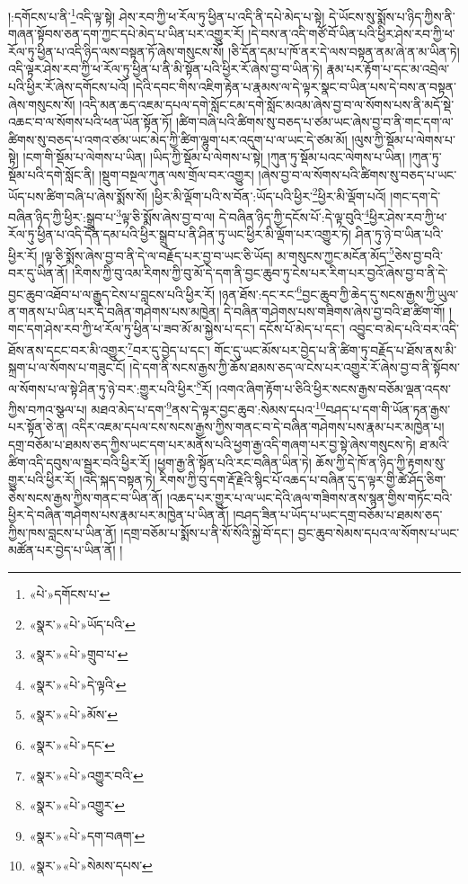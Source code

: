 །:དགོངས་པ་ནི་\footnote{«པེ་»དགོངས་པ་}འདི་ལྟ་སྟེ། ཤེས་རབ་ཀྱི་ཕ་རོལ་ཏུ་ཕྱིན་པ་འདི་ནི་དཔེ་མེད་པ་སྟེ། དེ་ཡོངས་སུ་སྨོས་པ་ཉིད་ཀྱིས་ནི་གཞན་སྟོབས་ཅན་དག་ཀྱང་དཔེ་མེད་པ་ཡིན་པར་འགྱུར་རོ། །དེ་བས་ན་འདི་གཙོ་བོ་ཡིན་པའི་ཕྱིར་ཤེས་རབ་ཀྱི་ཕ་རོལ་ཏུ་ཕྱིན་པ་འདི་ཉིད་ལས་བསྟན་ཏོ་ཞེས་གསུངས་སོ། །ཅི་དོན་དམ་པ་ཁོ་ནར་དེ་ལས་བསྟན་ནམ་ཞེ་ན་མ་ཡིན་ཏེ། འདི་ལྟར་ཤེས་རབ་ཀྱི་ཕ་རོལ་ཏུ་ཕྱིན་པ་ནི་མི་སྟོན་པའི་ཕྱིར་རོ་ཞེས་བྱ་བ་ཡིན་ཏེ། རྣམ་པར་རྟོག་པ་དང་མ་འབྲེལ་པའི་ཕྱིར་རོ་ཞེས་དགོངས་པའོ། །དེའི་དབང་གིས་འཇིག་རྟེན་པ་རྣམས་ལ་དེ་ལྟར་སྣང་བ་ཡིན་པས་དེ་བས་ན་བསྟན་ཞེས་གསུངས་སོ། །འདི་མན་ཆད་འཇམ་དཔལ་དགེ་སློང་ངམ་དགེ་སློང་མའམ་ཞེས་བྱ་བ་ལ་སོགས་པས་ནི་མདོ་སྡེ་འཆང་བ་ལ་སོགས་པའི་ཕན་ཡོན་སྟོན་ཏོ། །ཚིག་བཞི་པའི་ཚིགས་སུ་བཅད་པ་ཙམ་ཡང་ཞེས་བྱ་བ་ནི་གང་དག་ལ་ཚིགས་སུ་བཅད་པ་འགའ་ཙམ་ཡང་མེད་ཀྱི་ཚིག་ལྷུག་པར་འདུག་པ་ལ་ཡང་དེ་ཙམ་མོ། །ལུས་ཀྱི་སྡོམ་པ་ལེགས་པ་སྟེ། །ངག་གི་སྡོམ་པ་ལེགས་པ་ཡིན། །ཡིད་ཀྱི་སྡོམ་པ་ལེགས་པ་སྟེ། །ཀུན་ཏུ་སྡོམ་པའང་ལེགས་པ་ཡིན། །ཀུན་ཏུ་སྡོམ་པའི་དགེ་སློང་ནི། །སྡུག་བསྔལ་ཀུན་ལས་གྲོལ་བར་འགྱུར། །ཞེས་བྱ་བ་ལ་སོགས་པའི་ཚིགས་སུ་བཅད་པ་ཡང་ཡོད་པས་ཚིག་བཞི་པ་ཞེས་སྨོས་སོ། །ཕྱིར་མི་ལྡོག་པའི་ས་བོན་:ཡོད་པའི་ཕྱིར་\footnote{«སྣར་»«པེ་»ཡོད་པའི་}ཕྱིར་མི་ལྡོག་པའོ། །གང་དག་དེ་བཞིན་ཉིད་ཀྱི་ཕྱིར་:སྒྲུབ་པ་\footnote{«སྣར་»«པེ་»གྲུབ་པ་}ལྟ་ཅི་སྨོས་ཞེས་བྱ་བ་ལ། དེ་བཞིན་ཉིད་ཀྱི་དངོས་པོ་:དེ་ལྟ་བུའི་\footnote{«སྣར་»«པེ་»དེ་ལྟའི་}ཕྱིར་ཤེས་རབ་ཀྱི་ཕ་རོལ་ཏུ་ཕྱིན་པ་འདི་དོན་དམ་པའི་ཕྱིར་སྒྲུབ་པ་ནི་ཤིན་ཏུ་ཡང་ཕྱིར་མི་ལྡོག་པར་འགྱུར་ཏེ། ཤིན་ཏུ་ཉེ་བ་ཡིན་པའི་ཕྱིར་རོ། །ལྟ་ཅི་སྨོས་ཞེས་བྱ་བ་ནི་དེ་ལ་བརྗོད་པར་བྱ་བ་ཡང་ཅི་ཡོད། མ་གསུངས་ཀྱང་མངོན་མོད་\footnote{«སྣར་»«པེ་»མོས་}ཅེས་བྱ་བའི་བར་དུ་ཡིན་ནོ། །རིགས་ཀྱི་བུ་འམ་རིགས་ཀྱི་བུ་མོ་དེ་དག་ནི་བྱང་ཆུབ་ཏུ་ངེས་པར་རིག་པར་བྱའོ་ཞེས་བྱ་བ་ནི་དེ་བྱང་ཆུབ་འཐོབ་པ་ལ་རྒྱུད་ངེས་པ་བླངས་པའི་ཕྱིར་རོ། །ཉན་ཐོས་:དང་རང་\footnote{«སྣར་»«པེ་»དང་}བྱང་ཆུབ་ཀྱི་ཆེད་དུ་སངས་རྒྱས་ཀྱི་ཡུལ་ན་གནས་པ་ཡིན་པར་དེ་བཞིན་གཤེགས་པས་མཁྱེན། དེ་བཞིན་གཤེགས་པས་གཟིགས་ཞེས་བྱ་བའི་ཐ་ཚིག་གོ། །གང་དག་ཤེས་རབ་ཀྱི་ཕ་རོལ་ཏུ་ཕྱིན་པ་ཟབ་མོ་མ་སྐྱེས་པ་དང་། དངོས་པོ་མེད་པ་དང་། འབྱུང་བ་མེད་པའི་བར་འདི་ཐོས་ནས་དངང་བར་མི་འགྱུར་\footnote{«སྣར་»«པེ་»འགྱུར་བའི་}བར་དུ་བྱེད་པ་དང་། གོང་དུ་ཡང་མོས་པར་བྱེད་པ་ནི་ཚིག་ཏུ་བརྗོད་པ་ཐོས་ནས་མི་སྐྲག་པ་ལ་སོགས་པ་གཟུང་ངོ། །དེ་དག་ནི་སངས་རྒྱས་ཀྱི་ཆོས་ཐམས་ཅད་ལ་ངེས་པར་འགྱུར་རོ་ཞེས་བྱ་བ་ནི་སྟོབས་ལ་སོགས་པ་ལ་སྟེ་ཤིན་ཏུ་ཉེ་བར་:གྱུར་པའི་ཕྱིར་\footnote{«སྣར་»«པེ་»འགྱུར་}རོ། །འགའ་ཞིག་རྟོག་པ་ཅིའི་ཕྱིར་སངས་རྒྱས་བཅོམ་ལྡན་འདས་ཀྱིས་བཀའ་སྩལ་པ། མཐའ་མེད་པ་དག་\footnote{«སྣར་»«པེ་»དག་བཞག་}ནས་དེ་ལྟར་བྱང་ཆུབ་:སེམས་དཔའ་\footnote{«སྣར་»«པེ་»སེམས་དཔས་}བཤད་པ་དག་གི་ཡོན་ཏན་རྒྱས་པར་སྟོན་ཅེ་ན། འདིར་འཇམ་དཔལ་ངས་སངས་རྒྱས་ཀྱིས་གནང་བ་དེ་བཞིན་གཤེགས་པས་རྣམ་པར་མཁྱེན་པ། དགྲ་བཅོམ་པ་ཐམས་ཅད་ཀྱིས་ཡང་དག་པར་མནོས་པའི་ཕྱག་རྒྱ་འདི་གཞག་པར་བྱ་སྟེ་ཞེས་གསུངས་ཏེ། ཐ་མའི་ཚིག་འདི་དབུས་ལ་སྦྱར་བའི་ཕྱིར་རོ། །ཕྱག་རྒྱ་ནི་སྟོན་པའི་རང་བཞིན་ཡིན་ཏེ། ཆོས་ཀྱི་དེ་ཁོ་ན་ཉིད་ཀྱི་རྟགས་སུ་གྱུར་པའི་ཕྱིར་རོ། །འདི་སྐད་བསྟན་ཏེ། རིགས་ཀྱི་བུ་དག་རྡོ་རྗེའི་སྙིང་པོ་འཆད་པ་བཞིན་དུ་ད་ལྟར་གྱི་ཚེ་ཤོད་ཅིག་ཅེས་སངས་རྒྱས་ཀྱིས་གནང་བ་ཡིན་ནོ། །འཆད་པར་གྱུར་པ་ལ་ཡང་དེའི་ཞལ་གཟིགས་ནས་སྙན་གྱིས་གཏོང་བའི་ཕྱིར་དེ་བཞིན་གཤེགས་པས་རྣམ་པར་མཁྱེན་པ་ཡིན་ནོ། །བཤད་ཟིན་པ་ཡོད་པ་ཡང་དགྲ་བཅོམ་པ་ཐམས་ཅད་ཀྱིས་ཁས་བླངས་པ་ཡིན་ནོ། །དགྲ་བཅོམ་པ་སྨོས་པ་ནི་སོ་སོའི་སྐྱེ་བོ་དང་། བྱང་ཆུབ་སེམས་དཔའ་ལ་སོགས་པ་ཡང་མཚོན་པར་བྱེད་པ་ཡིན་ནོ། །
